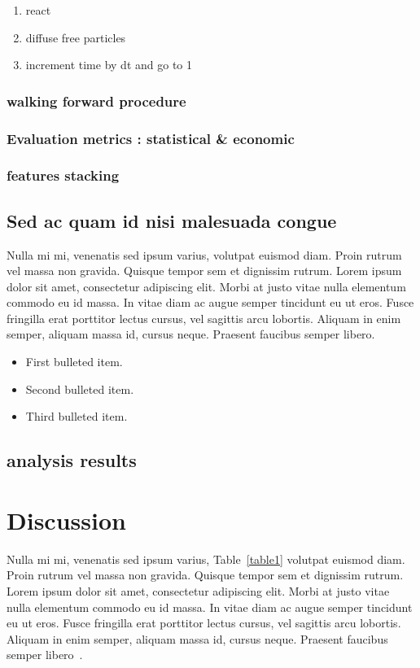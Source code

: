 \documentclass[10pt,letterpaper]{article}
\begin{document}
\begin{enumerate}
	\item{react}
	\item{diffuse free particles}
	\item{increment time by dt and go to 1}
\end{enumerate}

\subsubsection*{walking forward procedure}

\subsubsection*{Evaluation metrics : statistical & economic}

\subsubsection*{features stacking}

\subsection*{Sed ac quam id nisi malesuada congue}

Nulla mi mi, venenatis sed ipsum varius, volutpat euismod diam. Proin rutrum vel massa non gravida. Quisque tempor sem et dignissim rutrum. Lorem ipsum dolor sit amet, consectetur adipiscing elit. Morbi at justo vitae nulla elementum commodo eu id massa. In vitae diam ac augue semper tincidunt eu ut eros. Fusce fringilla erat porttitor lectus cursus, vel sagittis arcu lobortis. Aliquam in enim semper, aliquam massa id, cursus neque. Praesent faucibus semper libero.

\begin{itemize}
	\item First bulleted item.
	\item Second bulleted item.
	\item Third bulleted item.
\end{itemize}


\subsection*{analysis results}

\section*{Discussion}
Nulla mi mi, venenatis sed ipsum varius, Table~\ref{table1} volutpat euismod diam. Proin rutrum vel massa non gravida. Quisque tempor sem et dignissim rutrum. Lorem ipsum dolor sit amet, consectetur adipiscing elit. Morbi at justo vitae nulla elementum commodo eu id massa. In vitae diam ac augue semper tincidunt eu ut eros. Fusce fringilla erat porttitor lectus cursus, vel sagittis arcu lobortis. Aliquam in enim semper, aliquam massa id, cursus neque. Praesent faucibus semper libero~\cite{bib3}.
\end{document}
